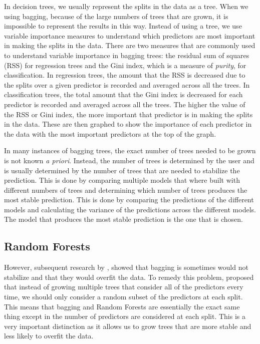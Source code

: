 In decision trees, we usually represent the splits in the data as a tree. When we using bagging, because of the large numbers of trees that are grown, it is impossible to represent the results in this way. Instead of using a tree, we use variable importance measures to understand which predictors are most important in making the splits in the data. There are two measures that are commonly used to understand variable importance in bagging trees: the residual sum of squares (RSS) for regression trees and the Gini index, which is a measure of \textit{purity}, for classification. In regression trees, the amount that the RSS is decreased due to the splits over a given predictor is recorded and averaged across all the trees. In classification trees, the total amount that the Gini index is decreased for each predictor is recorded and averaged across all the trees. The higher the value of the RSS or Gini index, the more important that predictor is in making the splits in the data. These are then graphed to show the importance of each predictor in the data with the most important predictors at the top of the graph.

In many instances of bagging trees, the exact number of trees needed to be grown is not known \textit{a priori}. Instead, the number of trees is determined by the user and is usually determined by the number of trees that are needed to stabilize the prediction. This is done by comparing multiple models that where built with different numbers of trees and determining which number of trees produces the most stable prediction. This is done by comparing the predictions of the different models and calculating the variance of the predictions across the different models. The model that produces the most stable prediction is the one that is chosen.

\subsection{Random Forests} \label{sec:random_forests}

However, subsequent research by \citet{breimanRandomForests2001}, showed that bagging is sometimes would not stabilize and that they would overfit the data. To remedy this problem, \citeauthor{breimanRandomForests2001} proposed that instead of growing multiple trees that consider all of the predictors every time, we should only consider a random subset of the predictors at each split. This means that bagging and Random Forests are essentially the exact same thing except in the number of predictors are considered at each split. This is a very important distinction as it allows us to grow trees that are more stable and less likely to overfit the data. 

